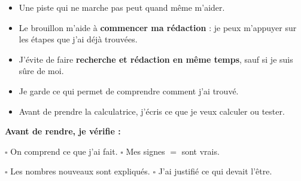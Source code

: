 \documentclass[10pt,a4paper]{article}
\begin{document}
\begin{minipage}[t]{0.485\textwidth}
\begin{tcolorbox}
\begin{itemize}
  \item Une piste qui ne marche pas peut quand même m'aider.

  \item Le brouillon m'aide à \textbf{commencer ma rédaction} :
  je peux m'appuyer sur les étapes que j'ai déjà trouvées.

  \item J'évite de faire \textbf{recherche et rédaction en même temps},
  sauf si je suis sûre de moi.

  \item Je garde ce qui permet de comprendre comment j'ai trouvé.

  \item Avant de prendre la calculatrice, j’écris ce que je veux calculer ou tester.
\end{itemize}
\end{tcolorbox}

\end{minipage}

\vspace{0.35em}


\begin{tcolorbox}[
  enhanced,
  colback=NeutreC!4,
  colframe=NeutreC!40,
  boxrule=0.6pt,
  arc=2mm,
  left=3mm,right=3mm,top=1.4mm,bottom=1.4mm,
  before skip=1mm,after skip=0mm
]
{\sffamily\bfseries\color{TitreC}Avant de rendre, je vérifie :}

\vspace{0.25em}

\small
\(\square\) On comprend ce que j'ai fait.
\qquad
\(\square\) Mes signes \(=\) sont vrais.

\vspace{0.15em}

\(\square\) Les nombres nouveaux sont expliqués.
\qquad
\(\square\) J'ai justifié ce qui devait l'être.
\end{tcolorbox}
\end{document}
